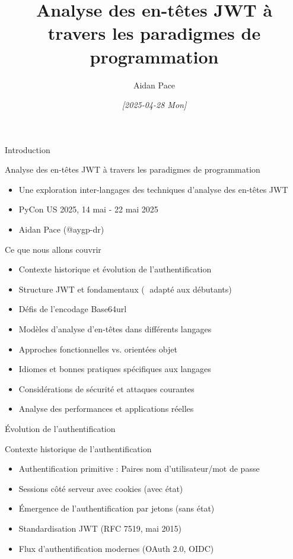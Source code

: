 \documentclass[presentation,aspectratio=169]{beamer}
\author{Aidan Pace}
\date{\textit{{[}2025-04-28 Mon]}}
\title{Analyse des en-têtes JWT à travers les paradigmes de programmation}
\begin{document}
\maketitle
\begin{frame}[label={sec:org367be5f}]{Introduction}
\begin{block}{Analyse des en-têtes JWT à travers les paradigmes de programmation}
\begin{itemize}[<+->]
\item Une exploration inter-langages des techniques d'analyse des en-têtes JWT
\item PyCon US 2025, 14 mai - 22 mai 2025
\item Aidan Pace (@aygp-dr)
\end{itemize}
\end{block}
\begin{block}{Ce que nous allons couvrir}
\begin{itemize}[<+->]
\item Contexte historique et évolution de l'authentification
\item Structure JWT et fondamentaux (🔰 adapté aux débutants)
\item Défis de l'encodage Base64url
\item Modèles d'analyse d'en-têtes dans différents langages
\item Approches fonctionnelles vs. orientées objet
\item Idiomes et bonnes pratiques spécifiques aux langages
\item Considérations de sécurité et attaques courantes
\item Analyse des performances et applications réelles
\end{itemize}
\end{block}
\end{frame}
\begin{frame}[label={sec:org70c48b0}]{Évolution de l'authentification}
\begin{block}{Contexte historique de l'authentification}
\begin{itemize}[<+->]
\item Authentification primitive : Paires nom d'utilisateur/mot de passe
\item Sessions côté serveur avec cookies (avec état)
\item Émergence de l'authentification par jetons (sans état)
\item Standardisation JWT (RFC 7519, mai 2015)
\item Flux d'authentification modernes (OAuth 2.0, OIDC)
\end{itemize}
\end{block}
\end{frame}
\end{document}

